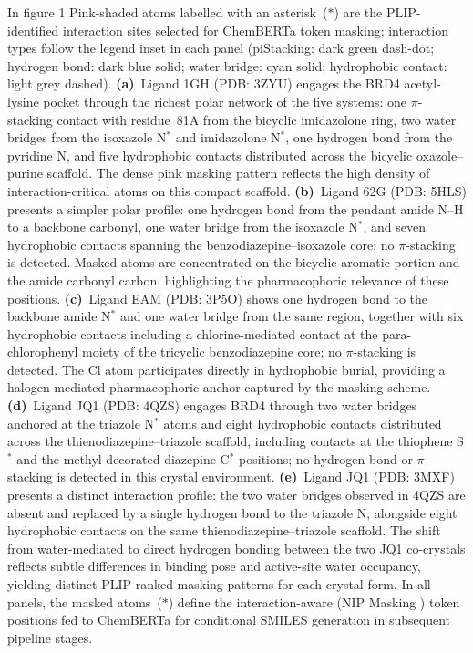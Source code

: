 \documentclass[a4paper,12pt]{article}
\begin{document}
In figure 1  Pink-shaded atoms labelled with an asterisk~($*$) are the
PLIP-identified interaction sites selected for ChemBERTa token
masking; interaction types follow the legend inset in each panel
(piStacking: dark green dash-dot; hydrogen bond: dark blue solid;
water bridge: cyan solid; hydrophobic contact: light grey dashed).
\textbf{(a)}~Ligand 1GH (PDB: 3ZYU) engages the BRD4 acetyl-lysine
pocket through the richest polar network of the five systems: one
$\pi$-stacking contact with residue~81A from the bicyclic
imidazolone ring, two water bridges from the isoxazole N$^{*}$ and
imidazolone N$^{*}$, one hydrogen bond from the pyridine N, and five
hydrophobic contacts distributed across the bicyclic
oxazole--purine scaffold.
The dense pink masking pattern reflects the high density of
interaction-critical atoms on this compact scaffold.
\textbf{(b)}~Ligand 62G (PDB: 5HLS) presents a simpler polar
profile: one hydrogen bond from the pendant amide N--H to a backbone
carbonyl, one water bridge from the isoxazole N$^{*}$, and seven
hydrophobic contacts spanning the benzodiazepine--isoxazole core; no
$\pi$-stacking is detected.
Masked atoms are concentrated on the bicyclic aromatic portion and
the amide carbonyl carbon, highlighting the pharmacophoric relevance
of these positions.
\textbf{(c)}~Ligand EAM (PDB: 3P5O) shows one hydrogen bond to the
backbone amide N$^{*}$ and one water bridge from the same region,
together with six hydrophobic contacts including a chlorine-mediated
contact at the para-chlorophenyl moiety of the tricyclic
benzodiazepine core; no $\pi$-stacking is detected.
The Cl atom participates directly in hydrophobic burial, providing a
halogen-mediated pharmacophoric anchor captured by the masking scheme.
\textbf{(d)}~Ligand JQ1 (PDB: 4QZS) engages BRD4 through two water
bridges anchored at the triazole N$^{*}$ atoms and eight hydrophobic
contacts distributed across the thienodiazepine--triazole scaffold,
including contacts at the thiophene S$^{*}$ and the methyl-decorated
diazepine C$^{*}$ positions; no hydrogen bond or $\pi$-stacking is
detected in this crystal environment.
\textbf{(e)}~Ligand JQ1 (PDB: 3MXF) presents a distinct interaction
profile: the two water bridges observed in 4QZS are absent and
replaced by a single hydrogen bond to the triazole N, alongside eight
hydrophobic contacts on the same thienodiazepine--triazole scaffold.
The shift from water-mediated to direct hydrogen bonding between the
two JQ1 co-crystals reflects subtle differences in binding pose and
active-site water occupancy, yielding distinct PLIP-ranked masking
patterns for each crystal form.
In all panels, the masked atoms~($*$) define the interaction-aware
(NIP Masking ) token positions fed to ChemBERTa for conditional SMILES
generation in subsequent pipeline stages.%
\normalsize
\end{document}
